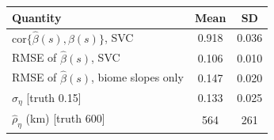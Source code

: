\begin{tabular}{@{}lcc@{}}
\toprule
Quantity & Mean & SD \\
\midrule
$\mathrm{cor}\{\hat\beta(s), \beta(s)\}$, SVC & 0.918 & 0.036 \\
RMSE of $\hat\beta(s)$, SVC & 0.106 & 0.010 \\
RMSE of $\hat\beta(s)$, biome slopes only & 0.147 & 0.020 \\
$\hat\sigma_\eta$ [truth 0.15] & 0.133 & 0.025 \\
$\hat\rho_\eta$ (km) [truth 600] & 564 & 261 \\
\bottomrule
\end{tabular}
